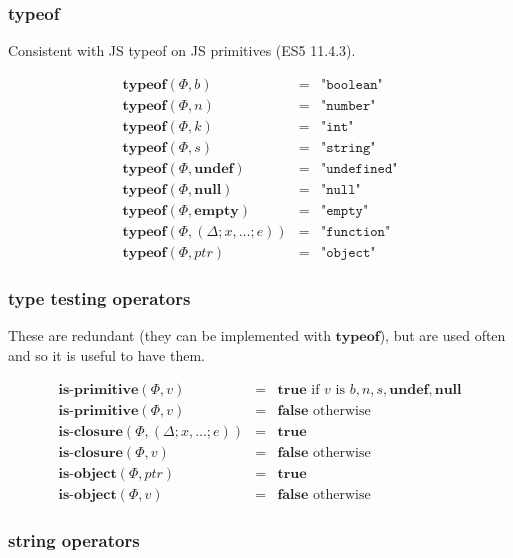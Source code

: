 \documentclass[draft, 10pt]{article}
\newcommand{\expr}[0]{e}
\newcommand{\var}[0]{x}
\newcommand{\bool}[0]{b}
\newcommand{\num}[0]{n}
\newcommand{\intg}[0]{k}
\newcommand{\str}[0]{s}
\newcommand{\undef}[0]{\textbf{undef}}
\newcommand{\nul}[0]{\textbf{null}}
\newcommand{\empt}[0]{\textbf{empty}}
\newcommand{\true}[0]{\textbf{true}}
\newcommand{\false}[0]{\textbf{false}}
\newcommand{\optypeof}[0]{\textbf{typeof}}
\newcommand{\opisprim}[0]{\textbf{is-primitive}}
\newcommand{\opisclosure}[0]{\textbf{is-closure}}
\newcommand{\opisobject}[0]{\textbf{is-object}}
\newcommand{\varenv}[0]{\Delta}
\newcommand{\heap}[0]{\Phi}
\newcommand{\closure}[3]{(#1; #2; #3)}
\newcommand{\bigval}[0]{v}
\newcommand{\heapptr}{ptr}
\newcommand{\rununop}[3]{#1(#2,#3)}
\begin{document}
\subsubsection{typeof}

Consistent with JS typeof on JS primitives (ES5 11.4.3).

\[
\begin{array}{rcl}
\rununop{\optypeof}{\heap}{\bool} &=& \texttt{"boolean"} \\
\rununop{\optypeof}{\heap}{\num} &=& \texttt{"number"} \\
\rununop{\optypeof}{\heap}{\intg} &=& \texttt{"int"} \\
\rununop{\optypeof}{\heap}{\str} &=& \texttt{"string"} \\
\rununop{\optypeof}{\heap}{\undef} &=& \texttt{"undefined"} \\
\rununop{\optypeof}{\heap}{\nul} &=& \texttt{"null"} \\
\rununop{\optypeof}{\heap}{\empt} &=& \texttt{"empty"} \\
\rununop{\optypeof}{\heap}{\closure{\varenv}{\var, \dots}{\expr}} &=& \texttt{"function"} \\
\rununop{\optypeof}{\heap}{\heapptr} &=& \texttt{"object"} 
\end{array}
\]

\subsubsection{type testing operators}

These are redundant (they can be implemented with $\optypeof$), 
but are used often and so it is useful to have them.

\[
\begin{array}{rcl}
\rununop{\opisprim}{\heap}{\bigval} &=& \true \textrm{ if $\bigval$ is $\bool, \num, \str, \undef, \nul$} \\
\rununop{\opisprim}{\heap}{\bigval} &=& \false \textrm{ otherwise} \\
\rununop{\opisclosure}{\heap}{\closure{\varenv}{\var, \dots}{\expr}} &=& \true \\
\rununop{\opisclosure}{\heap}{\bigval} &=& \false \textrm{ otherwise} \\
\rununop{\opisobject}{\heap}{\heapptr} &=& \true \\
\rununop{\opisobject}{\heap}{\bigval} &=& \false \textrm{ otherwise} 
\end{array}
\]

\subsubsection{string operators}
\end{document}
